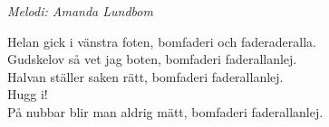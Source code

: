 {\footnotesize\textit{Melodi: Amanda Lundbom}}\par
\vspace{10pt}
Helan gick i vänstra foten, bomfaderi och faderaderalla.\\
Gudskelov så vet jag boten, bomfaderi faderallanlej.\\
Halvan ställer saken rätt, bomfaderi faderallanlej.\\
Hugg i!\\
På nubbar blir man aldrig mätt, bomfaderi faderallanlej.
